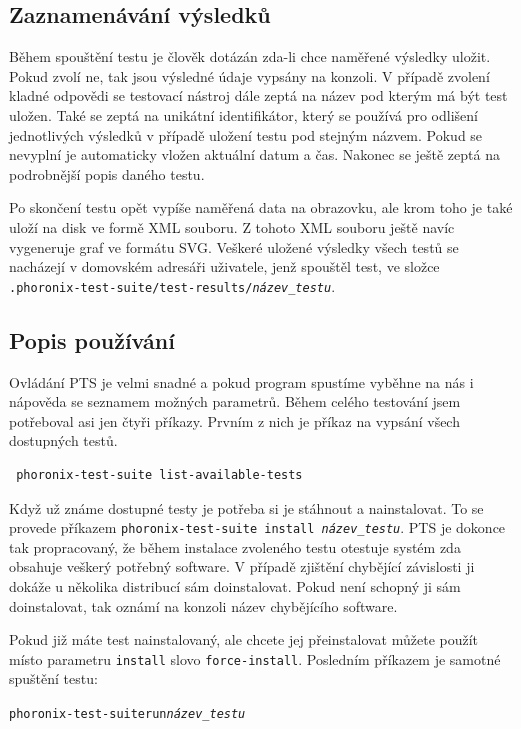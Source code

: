 \subsection{Zaznamenávání výsledků}
Během spouštění testu je člověk dotázán zda-li chce naměřené výsledky uložit. Pokud zvolí ne, tak jsou výsledné údaje vypsány na konzoli. V případě zvolení kladné odpovědi se testovací nástroj dále zeptá na název pod kterým má být test uložen. Také se zeptá na unikátní identifikátor, který se používá pro odlišení jednotlivých výsledků v případě uložení testu pod stejným názvem. Pokud se nevyplní je automaticky vložen aktuální datum a čas. Nakonec se ještě zeptá na podrobnější popis daného testu.

Po skončení testu opět vypíše naměřená data na obrazovku, ale krom toho je také uloží na disk ve formě XML souboru. Z tohoto XML souboru ještě navíc vygeneruje graf ve formátu SVG. Veškeré uložené výsledky všech testů se nacházejí v domovském adresáři uživatele, jenž spouštěl test, ve složce \texttt{.phoronix-test-suite/test-results/\textit{název\_testu}}.

\subsection{Popis používání}
Ovládání PTS je velmi snadné a pokud program spustíme vyběhne na nás i nápověda se seznamem možných parametrů. Během celého testování jsem potřeboval asi jen čtyři příkazy. Prvním z nich je příkaz na vypsání všech dostupných testů.
\begin{verbatim}
 phoronix-test-suite list-available-tests
\end{verbatim}
Když už známe dostupné testy je potřeba si je stáhnout a nainstalovat. To se provede příkazem \texttt{phoronix-test-suite install \textit{název\_testu}}. PTS je dokonce tak propracovaný, že během instalace zvoleného testu otestuje systém zda obsahuje veškerý potřebný software. V případě zjištění chybějící závislosti ji dokáže u několika distribucí sám doinstalovat. Pokud není schopný ji sám doinstalovat, tak oznámí na konzoli název chybějícího software.

Pokud již máte test nainstalovaný, ale chcete jej přeinstalovat můžete použít místo parametru \texttt{install} slovo \texttt{force-install}. Posledním příkazem je samotné spuštění testu:
\begin{alltt}
 phoronix-test-suite run \emph{název\_testu}
\end{alltt}

